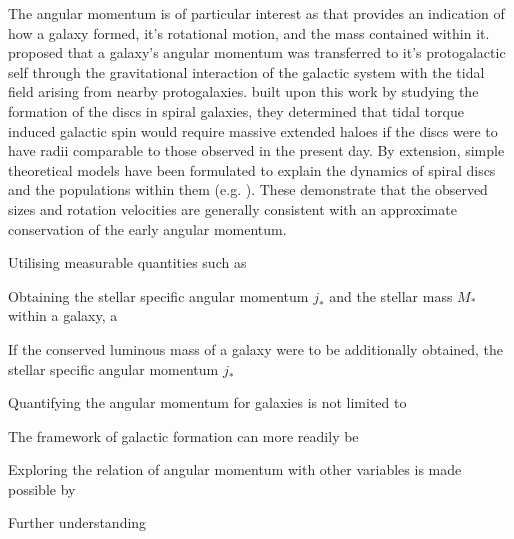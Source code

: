 \documentclass[12pt, twocolumn]{revtex4}    %
\begin{document}
The angular momentum is of particular interest as that provides an indication of how a galaxy formed, it's rotational motion, and the mass contained within it. \cite{1969ApJ...155..393P} proposed that a galaxy's angular momentum was transferred to it's protogalactic self through the gravitational interaction of the galactic system with the tidal field arising from nearby protogalaxies. \cite{1980MNRAS.193..189F} built upon this work by studying the formation of the discs in spiral galaxies, they determined that tidal torque induced galactic spin would require massive extended haloes if the discs were to have radii comparable to those observed in the present day. By extension, simple theoretical models have been formulated to explain the dynamics of spiral discs and the populations within them (e.g. \citealt{1998MNRAS.295..319M, 1997ApJ...482..659D}). These demonstrate that the observed sizes and rotation velocities are generally consistent with an approximate conservation of the early angular momentum. 

Utilising measurable quantities such as 

Obtaining the stellar specific angular momentum $j_*$ and the stellar mass $M_*$ within a galaxy, a 

If the conserved luminous mass of a galaxy were to be additionally obtained, the stellar specific angular momentum $j_*$

Quantifying the angular momentum for galaxies is not limited to 

The framework of galactic formation can more readily be 

Exploring the relation of angular momentum with other variables is made possible by 

Further understanding 
\end{document}
